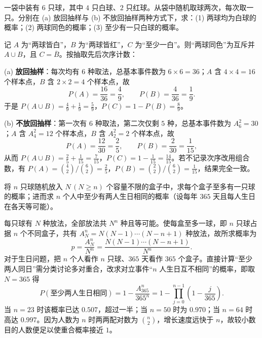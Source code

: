\begin{example}[title={放回抽样与不放回抽样}]
\label{eg:sampling-comparison}
一袋中装有 $6$ 只球，其中 $4$ 只白球、$2$ 只红球。从袋中随机取球两次，每次取一只。分别在 (a) 放回抽样与 (b) 不放回抽样两种方式下，求：(1) 两球均为白球的概率；(2) 两球同色的概率；(3) 至少有一只白球的概率。
\begin{solution}
记 $A$ 为“两球皆白”，$B$ 为“两球皆红”，$C$ 为“至少一白”。则“两球同色”为互斥并 $A\cup B$，且 $C=\overline{B}$。按抽取先后次序计数：

(a) \textbf{放回抽样}：每次均有 $6$ 种取法，总基本事件数为 $6\times 6=36$；$A$ 含 $4\times 4=16$ 个样本点，$B$ 含 $2\times 2=4$ 个样本点，故
\[
  P(A)=\frac{16}{36}=\frac{4}{9},\qquad
  P(B)=\frac{4}{36}=\frac{1}{9}.
\]
于是 $P(A\cup B)=\frac{4}{9}+\frac{1}{9}=\frac{5}{9}$，$P(C)=1-P(B)=\frac{8}{9}$。

(b) \textbf{不放回抽样}：第一次有 $6$ 种取法，第二次仅剩 $5$ 种，总基本事件数为 $A_6^2=30$；$A$ 含 $A_4^2=12$ 个样本点，$B$ 含 $A_2^2=2$ 个样本点，故
\[
  P(A)=\frac{12}{30}=\frac{2}{5},\qquad
  P(B)=\frac{2}{30}=\frac{1}{15},
\]
从而 $P(A\cup B)=\frac{2}{5}+\frac{1}{15}=\frac{7}{15}$，$P(C)=1-\frac{1}{15}=\frac{14}{15}$。若不记录次序改用组合数，有 $P(A)=\binom{4}{2}/\binom{6}{2}=\frac{2}{5}$，$P(B)=\binom{2}{2}/\binom{6}{2}=\frac{1}{15}$，结果完全一致。
\end{solution}
\end{example}

\begin{example}[title={分房问题与生日问题}]
\label{eg:birthday-problem}
将 $n$ 只球随机放入 $N\,(N\ge n)$ 个容量不限的盒子中，求每个盒子至多有一只球的概率；进而求 $n$ 个人中至少有两人生日相同的概率（设每年 $365$ 天且每人生日在各天等可能）。
\begin{solution}
每只球有 $N$ 种放法，全部放法共 $N^n$ 种且等可能。使每盒至多一球，即 $n$ 只球占据 $n$ 个不同盒子，共有 $A_N^n=N(N-1)\cdots(N-n+1)$ 种放法，故所求概率为
\[
  p=\frac{A_N^n}{N^n}=\frac{N(N-1)\cdots(N-n+1)}{N^n}.
\]
对于生日问题，把 $n$ 个人看作 $n$ 只球、$365$ 天看作 $365$ 个盒子。直接计算“至少两人同日”需分类讨论多对重合，改求对立事件“$n$ 人生日互不相同”的概率，即取 $N=365$ 得
\[
  P(\text{至少两人生日相同})=1-\frac{A_{365}^n}{365^n}
  =1-\prod_{j=0}^{n-1}\left(1-\frac{j}{365}\right).
\]
当 $n=23$ 时该概率已达 $0.507$，超过一半；当 $n=50$ 时为 $0.970$；当 $n=64$ 时高达 $0.997$。因为人数为 $n$ 时两两配对数为 $\binom{n}{2}$，增长速度远快于 $n$，故较小数目的人数便足以使重合概率接近 $1$。
\end{solution}
\end{example}

